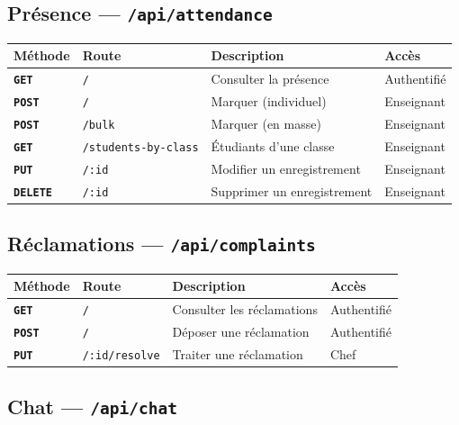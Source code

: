 \documentclass[12pt,a4paper]{article}
\newcommand{\route}[1]{\texorpdfstring{\texttt{\small\color{routeGray}#1}}{#1}}
\newcommand{\httpmethod}[1]{%
  \ifstrequal{#1}{GET}{\colorbox{blue!15}{\texttt{\bfseries\color{blue!70!black}GET}}}{}%
  \ifstrequal{#1}{POST}{\colorbox{green!18}{\texttt{\bfseries\color{green!60!black}POST}}}{}%
  \ifstrequal{#1}{PUT}{\colorbox{orange!18}{\texttt{\bfseries\color{orange!70!black}PUT}}}{}%
  \ifstrequal{#1}{DELETE}{\colorbox{red!15}{\texttt{\bfseries\color{red!70!black}DELETE}}}{}%
}
\begin{document}
\subsection{Présence — \route{/api/attendance}}

\begin{center}
\begin{tabular}{l>{\raggedright\arraybackslash}p{5.6cm}>{\raggedright\arraybackslash}p{4.4cm}l}
  \toprule
  \textbf{Méthode} & \textbf{Route} & \textbf{Description} & \textbf{Accès} \\
  \midrule
  \httpmethod{GET} & \texttt{/} & Consulter la présence & Authentifié \\
  \httpmethod{POST} & \texttt{/} & Marquer (individuel) & Enseignant \\
  \httpmethod{POST} & \texttt{/bulk} & Marquer (en masse) & Enseignant \\
  \httpmethod{GET} & \texttt{/students-by-class} & Étudiants d'une classe & Enseignant \\
  \httpmethod{PUT} & \texttt{/:id} & Modifier un enregistrement & Enseignant \\
  \httpmethod{DELETE} & \texttt{/:id} & Supprimer un enregistrement & Enseignant \\
  \bottomrule
\end{tabular}
\end{center}

\subsection{Réclamations — \route{/api/complaints}}

\begin{center}
\begin{tabular}{l>{\raggedright\arraybackslash}p{5.6cm}>{\raggedright\arraybackslash}p{4.4cm}l}
  \toprule
  \textbf{Méthode} & \textbf{Route} & \textbf{Description} & \textbf{Accès} \\
  \midrule
  \httpmethod{GET} & \texttt{/} & Consulter les réclamations & Authentifié \\
  \httpmethod{POST} & \texttt{/} & Déposer une réclamation & Authentifié \\
  \httpmethod{PUT} & \texttt{/:id/resolve} & Traiter une réclamation & Chef \\
  \bottomrule
\end{tabular}
\end{center}

\subsection{Chat — \route{/api/chat}}
\end{document}
